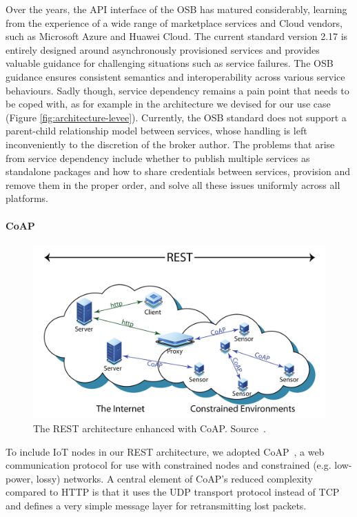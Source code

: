 Over the years, the API interface of the OSB has matured considerably, learning from the experience of a wide range of marketplace services and Cloud vendors, such as Microsoft Azure and Huawei Cloud. The current standard version 2.17 is entirely designed around asynchronously provisioned services and provides valuable guidance for challenging situations such as service failures. 
The OSB guidance ensures consistent semantics and interoperability across various service behaviours.
Sadly though, service dependency remains a pain point that needs to be coped with, as for example in the architecture we devised for our use case (Figure \ref{fig:architecture-levee}). 
Currently, the OSB standard does not support a parent-child relationship model between services, whose handling is left inconveniently to the discretion of the broker author. 
The problems that arise from service dependency include whether to publish multiple services as standalone packages and how to share credentials between services, provision and remove them in the proper order, and solve all these issues uniformly across all platforms.

\paragraph{CoAP}\label{sec:coap}

\begin{figure}[ht]
\centering
\includegraphics[width=\columnwidth]{figures/coap}
\caption{The REST architecture enhanced with CoAP. Source~\cite{bormann2012coap}.}
\label{fig:coap}
\end{figure}

To include IoT nodes in our REST architecture, we adopted CoAP~\cite{bormann2012coap}, a web communication protocol for use with constrained nodes and constrained (e.g. low-power, lossy) networks. A central element of CoAP's reduced complexity compared to HTTP is that it uses the UDP transport protocol instead of TCP and defines a very simple message layer for retransmitting lost packets.

